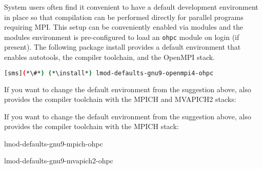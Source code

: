 System users often find it convenient to have a default development environment
in place so that compilation can be performed directly for parallel programs
requiring MPI. This setup can be conveniently enabled via modules and the \OHPC{}
modules environment is pre-configured to load an \texttt{ohpc} module on login
(if present). The following package install provides a default
environment that enables autotools, the \GNU{} compiler toolchain, and the
OpenMPI stack.

\begin{lstlisting}[language=bash]
[sms](*\#*) (*\install*) lmod-defaults-gnu9-openmpi4-ohpc
\end{lstlisting}

\begin{center}
\begin{tcolorbox}[]
\small
{}
If you want to change the default environment from the suggestion above, \OHPC{}
also provides the \GNU{} compiler toolchain with the MPICH and MVAPICH2 stacks:
\fi

If you want to change the default environment from the suggestion above, \OHPC{}
also provides the \GNU{} compiler toolchain with the MPICH stack:
\fi

\begin{itemize*}
\item lmod-defaults-gnu9-mpich-ohpc
\item lmod-defaults-gnu9-mvapich2-ohpc
\fi
\end{itemize*}
\end{tcolorbox}
\end{center}
